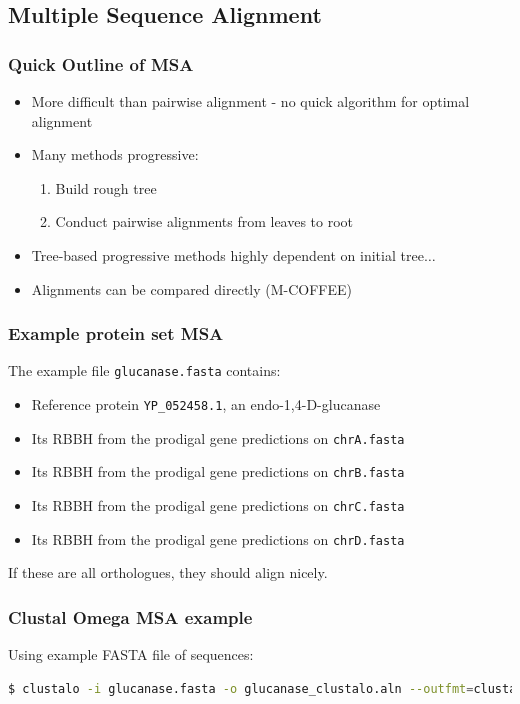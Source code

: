%

\subsection{Multiple Sequence Alignment}

\begin{frame}
\frametitle{Quick Outline of MSA}
\begin{itemize}
  \item More difficult than pairwise alignment - no quick algorithm for optimal alignment
  \item Many methods progressive:
  \begin{enumerate}
    \item Build rough tree
    \item Conduct pairwise alignments from leaves to root
  \end{enumerate}
  \item Tree-based progressive methods highly dependent on initial tree$\ldots$
  \item Alignments can be compared directly (M-COFFEE)
\end{itemize}
\end{frame}

\begin{frame}
\frametitle{Example protein set MSA}
The example file \texttt{glucanase.fasta} contains:
\begin{itemize}
\item Reference protein \texttt{YP\_052458.1}, an endo-1,4-D-glucanase
\item Its RBBH from the prodigal gene predictions on \texttt{chrA.fasta}
\item Its RBBH from the prodigal gene predictions on \texttt{chrB.fasta}
\item Its RBBH from the prodigal gene predictions on \texttt{chrC.fasta}
\item Its RBBH from the prodigal gene predictions on \texttt{chrD.fasta}
\end{itemize}
If these are all orthologues, they should align nicely.
\end{frame}

\begin{frame}[fragile]
\frametitle{Clustal Omega MSA example}
Using example FASTA file of sequences:
\begin{lstlisting}[language=bash]
$ clustalo -i glucanase.fasta -o glucanase_clustalo.aln --outfmt=clustal
\end{lstlisting}
\end{frame}


